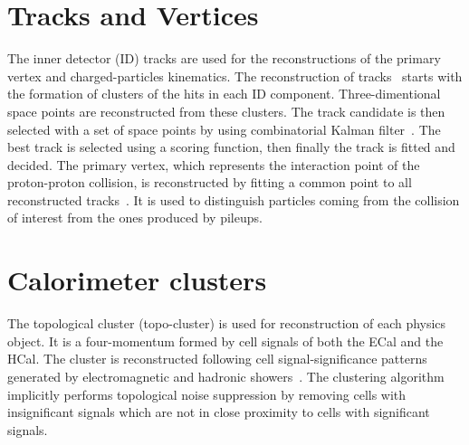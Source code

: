 \section{Tracks and Vertices}
The inner detector (ID) tracks are used for the reconstructions of the primary vertex and charged-particles kinematics.
The reconstruction of tracks~\cite{PERF-2015-08} starts with the formation of clusters of the hits in each ID component.
Three-dimentional space points are reconstructed from these clusters.
The track candidate is then selected with a set of space points by using combinatorial Kalman filter~\cite{FRUHWIRTH1987444}. 
The best track is selected using a scoring function, then finally the track is fitted and decided. 
The primary vertex, which represents the interaction point of the proton-proton collision, is reconstructed by fitting a common point to all reconstructed tracks~\cite{PERF-2015-01}. It is used to distinguish particles coming from the collision of interest from the ones produced by pileups.
\section{Calorimeter clusters} 
The topological cluster (topo-cluster) is used for reconstruction of each physics object. It is a four-momentum formed by cell signals of both the ECal and the HCal.
The cluster is reconstructed following cell signal-significance patterns generated by electromagnetic and hadronic showers~\cite{PERF-2014-07}.
The clustering algorithm implicitly performs topological noise suppression by removing cells with insignificant signals which are not in close proximity to cells with significant signals. 
